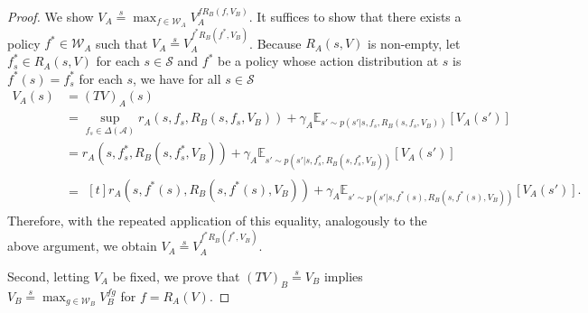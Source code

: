 \documentclass{acml}
\providecommand{\E}{\mathbb{E}} %
\providecommand{\eqs}{\stackrel{s}{=}}
\begin{document}
\begin{proof}
	We show $V_A \eqs \max_{f \in \mathcal{W}_A} V_A^{f R_B(f,V_B)}$.
	It suffices to show that there exists a policy $f^* \in \mathcal{W}_A$ such that $V_A \eqs V_A^{f^* R_B(f^*,V_B)}$.     
	Because $R_A(s, V)$ is non-empty, let $f_s^* \in R_A(s, V)$ for each $s \in \mathcal{S}$ and $f^*$ be a policy whose action distribution at $s$ is $f^*(s) = f_s^*$ for each $s$, we have for all $s \in \mathcal{S}$
	\begin{subequations}
		\begin{align}
			V_A(s) &= (TV)_A(s) \\
			&= \sup_{f_s \in \Delta(\mathcal{A})} r_A(s,f_s,R_B(s,f_s,V_B))+\gamma_A\E_{s'\sim p(s'|s,f_s,R_B(s,f_s,V_B))}\left[V_A(s')\right] \\
			&= r_A(s,f_s^*,R_B(s,f_s^*,V_B))+\gamma_A\E_{s'\sim p(s'|s,f_s^*,R_B(s,f_s^*,V_B))}\left[V_A(s')\right] \\
			&=\begin{multlined}[t]
			    r_A(s,f^*(s),R_B(s,f^*(s),V_B))
                    +\gamma_A\E_{s'\sim p(s'|s,f^*(s),R_B(s,f^*(s),V_B))}\left[V_A(s')\right].
			\end{multlined}
		\end{align}
	\end{subequations}
	Therefore, with the repeated application of this equality, analogously to the above argument, we obtain $V_A \eqs V_A^{f^* R_B(f^*,V_B)}$.
	
	Second, letting $V_A$ be fixed, we prove that $(TV)_B \eqs V_B$ implies $V_B \eqs \max_{g\in\mathcal{W}_B}V_B^{fg}$ for $f=R_A(V)$.
	

\end{proof}
\end{document}
